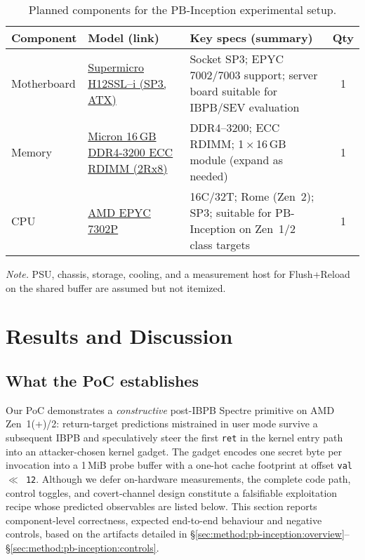 \documentclass[11pt,a4paper]{article}
\begin{document}
\setlength{\tabcolsep}{6pt}
\renewcommand{\arraystretch}{1.15}
\begin{table}[t]
  \centering
  \caption{Planned components for the PB-Inception experimental setup.}
  \label{tab:pbinc-components}
  \begin{tabularx}{\linewidth}{@{} l Y Y c @{}}
    \toprule
    \textbf{Component} & \textbf{Model (link)} & \textbf{Key specs (summary)} & \textbf{Qty} \\
    \midrule
    Motherboard &
      \href{https://www.digitec.ch/de/s1/product/supermicro-h12ssl-i-sp3-amd-soc-atx-mainboard-13904801}
           {Supermicro H12SSL--i (SP3, ATX)} &
      Socket SP3; EPYC 7002/7003 support; server board suitable for IBPB/SEV evaluation & 1 \\
    Memory &
      \href{https://www.digitec.ch/de/s1/product/micron-16gb-ddr4-3200-2rx8-ecc-rdimm-1-x-16gb-3200-mhz-ddr4-ram-dimm-ram-21164557}
           {Micron 16\,GB DDR4-3200 ECC RDIMM (2Rx8)} &
      DDR4--3200; ECC RDIMM; 1\,$\times$\,16\,GB module (expand as needed) & 1 \\
    CPU &
      \href{https://www.galaxus.ch/de/s1/product/amd-epyc-7302p-sp3-3-ghz-16-core-prozessor-13259327}
           {AMD EPYC 7302P} &
      16C/32T; Rome (Zen~2); SP3; suitable for PB-Inception on Zen~1/2 class targets & 1 \\
    \bottomrule
  \end{tabularx}

  \vspace{0.4em}
  \footnotesize\emph{Note.} PSU, chassis, storage, cooling, and a measurement host for Flush+Reload on the shared buffer are assumed but not itemized.
\end{table}

\section{Results and Discussion}
\label{sec:results}

\subsection{What the PoC establishes}
Our PoC demonstrates a \emph{constructive} post-IBPB Spectre primitive on AMD Zen~1(+)/2: return-target predictions mistrained in user mode survive a subsequent IBPB and speculatively steer the first \texttt{ret} in the kernel entry path into an attacker-chosen kernel gadget. The gadget encodes one secret byte per invocation into a 1\,MiB probe buffer with a one-hot cache footprint at offset \texttt{val $\ll$ 12}. Although we defer on-hardware measurements, the complete code path, control toggles, and covert-channel design constitute a falsifiable exploitation recipe whose predicted observables are listed below. This section reports component-level correctness, expected end-to-end behaviour and negative controls, based on the artifacts detailed in \S\ref{sec:method:pb-inception:overview}--\S\ref{sec:method:pb-inception:controls}.\cite{wikner2025breaking,trujillo2023inception,linux_srso_doc,linux_rsb_doc}
\end{document}
